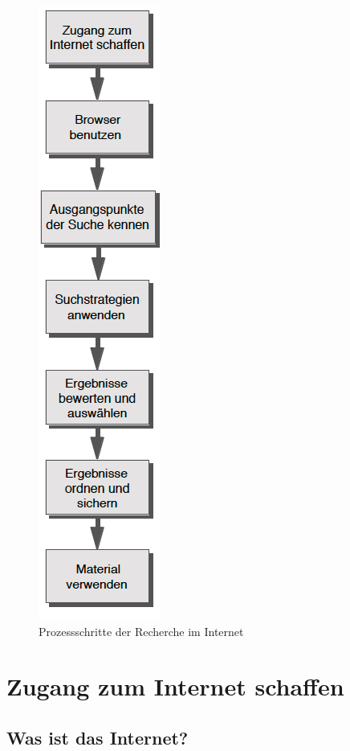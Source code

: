 \documentclass[]{book}
\theoremstyle{definition}
\theoremstyle{definition}
\theoremstyle{definition}
\theoremstyle{remark}
\begin{document}
\begin{figure}

{\centering \includegraphics{images/recherchieren-internet-ablauf-min} 

}

\caption{Prozessschritte der Recherche im Internet}\label{fig:unnamed-chunk-12}
\end{figure}

\section{Zugang zum Internet
schaffen}\label{zugang-zum-internet-schaffen}

\subsection{Was ist das Internet?}\label{was-ist-das-internet}
\end{document}
